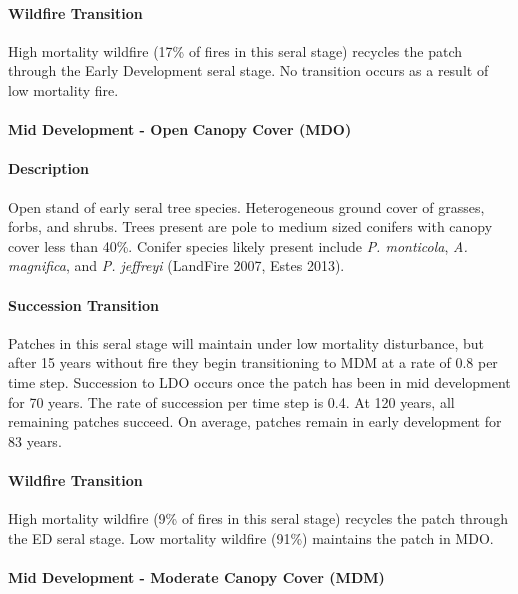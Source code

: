 \paragraph{Wildfire Transition} High mortality wildfire (17\% of fires in this seral stage) recycles the patch through the Early Development seral stage. No transition occurs as a result of low mortality fire.

\noindent\hrulefill


\paragraph{Mid Development - Open Canopy Cover (MDO)}

\paragraph{Description} Open stand of early seral tree species. Heterogeneous ground cover of grasses, forbs, and shrubs. Trees present are pole to medium sized conifers with canopy cover less than 40\%. Conifer species likely present include \emph{P. monticola}, \emph{A. magnifica}, and \emph{P. jeffreyi} (LandFire 2007, Estes 2013).

\paragraph{Succession Transition} Patches in this seral stage will maintain under low mortality disturbance, but after 15 years without fire they begin transitioning to MDM at a rate of 0.8 per time step. Succession to LDO occurs once the patch has been in mid development for 70 years. The rate of succession per time step is 0.4. At 120 years, all remaining patches succeed. On average, patches remain in early development for 83 years.

\paragraph{Wildfire Transition} High mortality wildfire (9\% of fires in this seral stage) recycles the patch through the ED seral stage. Low mortality wildfire (91\%) maintains the patch in MDO.

\noindent\hrulefill

\paragraph{Mid Development - Moderate Canopy Cover (MDM)}

